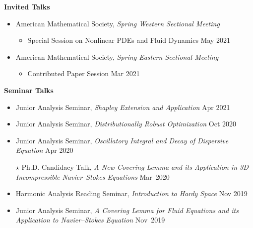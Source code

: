\documentclass[margin,line]{res}
\begin{document}
\begin{resume}
\begin{itemize}[leftmargin=0.15in, label=$\sqbullet$]
\end{itemize}

\nvspace 
{\bf Invited Talks}
\vvspace

\begin{itemize}[leftmargin=0.15in, label=$\sqbullet$]
        
    \item American Mathematical Society, \textit{Spring Western Sectional Meeting} 
        \nvspace
        \begin{itemize}
            \item Special Session on Nonlinear PDEs and Fluid Dynamics \hfill May 2021
        \end{itemize}
    
    \item American Mathematical Society, \textit{Spring Eastern Sectional Meeting}
        \nvspace 
        \begin{itemize}
            \item Contributed Paper Session \hfill Mar 2021
        \end{itemize}
    
\end{itemize}

\nvspace 
{\bf Seminar Talks}
\vvspace

\begin{itemize}[leftmargin=0.15in, label=$\sqbullet$]
    
    \item Junior Analysis Seminar,
    \textit{Shapley Extension and Application}
    \hfill Apr 2021
    
    \item Junior Analysis Seminar, 
    \textit{Distributionally Robust Optimization}
    \hfill Oct 2020
    
    \item Junior Analysis Seminar, 
    \textit{Oscillatory Integral and Decay of Dispersive Equation }
    \hfill Apr 2020

    \item[$\star$] Ph.D. Candidacy Talk,
    \textit{A New Covering Lemma and its Application in 3D Incompressible Navier--Stokes Equations}
    \hfill Mar~2020

    \item Harmonic Analysis Reading Seminar,
    \textit{Introduction to Hardy Space}
    \hfill Nov 2019
    
    \item Junior Analysis Seminar, 
    \textit{A Covering Lemma for Fluid Equations and its Application to Navier--Stokes Equation} \hfill Nov~2019
    

\end{itemize}
\end{resume}
\end{document}
